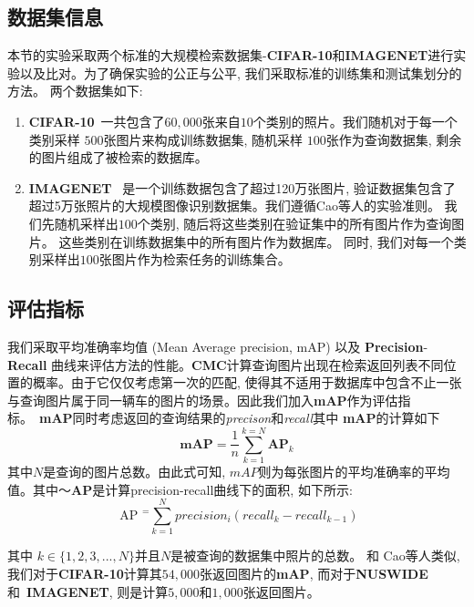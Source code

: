 \subsection{数据集信息}
本节的实验采取两个标准的大规模检索数据集-\textbf{CIFAR-10}和\textbf{IMAGENET}进行实验以及比对。为了确保实验的公正与公平, 我们采取标准的训练集和测试集划分的方法。 两个数据集如下:
\begin{enumerate}
    \item \textbf{CIFAR-10}~\cite{krizhevsky2009learning}一共包含了$60,000$张来自$10$个类别的照片。我们随机对于每一个类别采样 $500$张图片来构成训练数据集, 随机采样 $100$张作为查询数据集, 剩余的图片组成了被检索的数据库。 
    \item  \textbf{IMAGENET}~\cite{russakovsky2015imagenet} 是一个训练数据包含了超过120万张图片, 验证数据集包含了超过5万张照片的大规模图像识别数据集。我们遵循Cao等人的实验准则\cite{cao2017hashnet}。 我们先随机采样出$100$个类别, 随后将这些类别在验证集中的所有图片作为查询图片。 这些类别在训练数据集中的所有图片作为数据库。 同时, 我们对每一个类别采样出$100$张图片作为检索任务的训练集合。 
\end{enumerate}


\subsection{评估指标}
我们采取平均准确率均值 (Mean Average precision, mAP) 以及 \textbf{Precision}-\textbf{Recall}   曲线来评估方法的性能。\textbf{CMC}计算查询图片出现在检索返回列表不同位置的概率。由于它仅仅考虑第一次的匹配, 使得其不适用于数据库中包含不止一张与查询图片属于同一辆车的图片的场景。因此我们加入\textbf{mAP}作为评估指标。~\textbf{mAP}同时考虑返回的查询结果的\textit{precison}和\textit{recall}其中 \textbf{mAP}的计算如下
\begin{equation}
   \textbf{mAP} = \frac{1}{n} \sum_{k=1}^{k= N} \textbf{AP}_k
\end{equation}
其中$N$是查询的图片总数。由此式可知, $mAP$则为每张图片的平均准确率的平均值。其中～\textbf{AP}是计算precision-recall曲线下的面积, 如下所示:
\begin{equation}
  \text { AP }^{=} \sum_{k=1}^{N} precision _{i}\left( recall _{k}- recall _{k-1}\right)
\end{equation}

其中 $k \in \{1, 2, 3, ..., N\}$并且$N$是被查询的数据集中照片的总数。
和 Cao等人类似\cite{cao2018deep,cao2017hashnet}, 我们对于\textbf{CIFAR-10}计算其$54,000$张返回图片的\textbf{mAP}, 而对于\textbf{NUSWIDE}和~\textbf{IMAGENET}, 则是计算$5,000$和$1,000$张返回图片。
